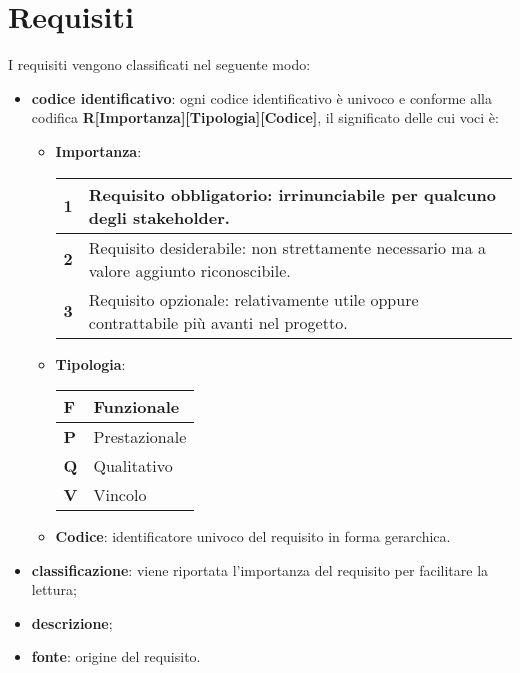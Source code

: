 \section{Requisiti}

    I requisiti vengono classificati nel seguente modo:
    \begin{itemize}
        \item \textbf{codice identificativo}: ogni codice identificativo è univoco e conforme alla codifica \textbf{R[Importanza][Tipologia][Codice]}, il significato delle cui voci è:
        \begin{itemize}
            \item \textbf{Importanza}:
            \begin{center}
                \renewcommand{\arraystretch}{1.5}
                \begin{tabular}{m{2em} m{25em}}
                    \hline
                    \textbf{1} & Requisito obbligatorio: irrinunciabile per qualcuno degli stakeholder. \\
                    \hline
                    \textbf{2} & Requisito desiderabile: non strettamente necessario ma  a valore aggiunto riconoscibile. \\
                    \hline
                    \textbf{3} &  Requisito opzionale: relativamente utile oppure contrattabile più avanti nel progetto. \\
                    \hline
                \end{tabular}
            \end{center}

            \item \textbf{Tipologia}:
            \begin{center}
                \renewcommand{\arraystretch}{1.5}
                \begin{tabular}{m{2em} m{10em}}
                    \hline
                    \textbf{F} & Funzionale \\
                    \hline
                    \textbf{P} & Prestazionale \\
                    \hline
                    \textbf{Q} & Qualitativo \\
                    \hline
                    \textbf{V} &  Vincolo \\
                    \hline
                \end{tabular}
            \end{center}
            \item \textbf{Codice}: identificatore univoco del requisito in forma gerarchica.
        \end{itemize}

        \item \textbf{classificazione}: viene riportata l'importanza del requisito per facilitare la lettura;
        \item \textbf{descrizione};
        \item \textbf{fonte}: origine del requisito.
    \end{itemize}

